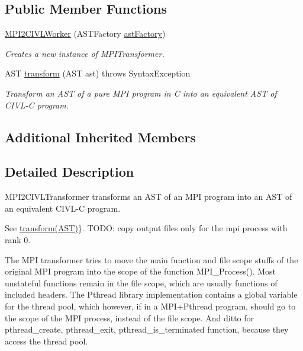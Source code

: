\subsection*{Public Member Functions}
\begin{DoxyCompactItemize}
\item 
\hyperlink{classedu_1_1udel_1_1cis_1_1vsl_1_1civl_1_1transform_1_1common_1_1MPI2CIVLWorker_a1f8ba4f07a7b813d7717121ea9222afb}{M\+P\+I2\+C\+I\+V\+L\+Worker} (A\+S\+T\+Factory \hyperlink{classedu_1_1udel_1_1cis_1_1vsl_1_1civl_1_1transform_1_1common_1_1BaseWorker_a44812bb476e4511fb6ca29a808427186}{ast\+Factory})
\begin{DoxyCompactList}\small\item\em Creates a new instance of M\+P\+I\+Transformer. \end{DoxyCompactList}\item 
A\+S\+T \hyperlink{classedu_1_1udel_1_1cis_1_1vsl_1_1civl_1_1transform_1_1common_1_1MPI2CIVLWorker_a12822bbf9e1075ba98ff31cfed918b63}{transform} (A\+S\+T ast)  throws Syntax\+Exception 
\begin{DoxyCompactList}\small\item\em Transform an A\+S\+T of a pure M\+P\+I program in C into an equivalent A\+S\+T of C\+I\+V\+L-\/\+C program. \end{DoxyCompactList}\end{DoxyCompactItemize}
\subsection*{Additional Inherited Members}


\subsection{Detailed Description}
M\+P\+I2\+C\+I\+V\+L\+Transformer transforms an A\+S\+T of an M\+P\+I program into an A\+S\+T of an equivalent C\+I\+V\+L-\/\+C program. 

See  \hyperlink{classedu_1_1udel_1_1cis_1_1vsl_1_1civl_1_1transform_1_1common_1_1MPI2CIVLWorker_a12822bbf9e1075ba98ff31cfed918b63}{transform(\+A\+S\+T)}\}. T\+O\+D\+O\+: copy output files only for the mpi process with rank 0.

The M\+P\+I transformer tries to move the main function and file scope stuffs of the original M\+P\+I program into the scope of the function M\+P\+I\+\_\+\+Process(). Most unstateful functions remain in the file scope, which are usually functions of included headers. The Pthread library implementation contains a global variable for the thread pool, which however, if in a M\+P\+I+\+Pthread program, should go to the scope of the M\+P\+I process, instead of the file scope. And ditto for pthread\+\_\+create, pthread\+\_\+exit, pthread\+\_\+is\+\_\+terminated function, because they access the thread pool.

